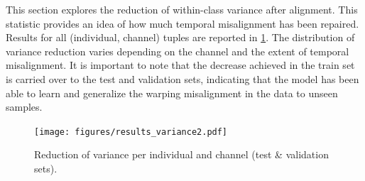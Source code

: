 This section explores the reduction of within-class variance after alignment. This statistic provides an idea of how much temporal misalignment has been repaired. Results for all  (individual, channel) tuples are reported in \cref{fig:phm_variance}. 
The distribution of variance reduction varies depending on the channel and the extent of temporal misalignment. It is important to note that the decrease achieved in the train set is carried over to the test and validation sets, indicating that the model has been able to learn and generalize the warping misalignment in the data to unseen samples.

\begin{figure}[!htb]
    \begin{center}
    \centerline{\texttt{[image: figures/results\_variance2.pdf]}}
    \vspace{-0.3cm}
    \caption{Reduction of variance per individual and channel (test \& validation sets).}
    \label{fig:phm_variance}
    \end{center}
    \vspace{-1cm}
\end{figure}
\clearpage

